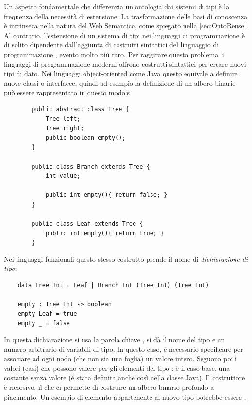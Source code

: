 Un aspetto fondamentale che differenzia un'ontologia dai sistemi di tipi è la frequenza della necessità di estensione. La trasformazione delle basi di conoscenza è intrinseca nella natura del Web Semantico, come spiegato nella \autoref{sec:OntoReuse}. Al contrario, l'estensione di un sistema di tipi nei linguaggi di programmazione è di solito dipendente dall'aggiunta di costrutti sintattici del linguaggio di programmazione \cite{pierceTypesBook}, evento molto più raro. Per raggirare questo problema, i linguaggi di programmazione moderni offrono costrutti sintattici per creare nuovi tipi di dato. Nei linguaggi object-oriented come Java questo equivale a definire nuove classi o interfacce, quindi ad esempio la definizione di un albero binario può essere rappresentato in questo modo:s
\begin{verbatim}
		public abstract class Tree {
			Tree left;
			Tree right;
			public boolean empty();
		}
		
		public class Branch extends Tree {
			int value;
		
			public int empty(){ return false; }
		}
		
		public class Leaf extends Tree {	
			public int empty(){ return true; }
		}
\end{verbatim}
\newpage\noindent
Nei linguaggi funzionali questo stesso costrutto prende il nome di \textit{dichiarazione di tipo}:
\begin{verbatim}
	data Tree Int = Leaf | Branch Int (Tree Int) (Tree Int)
	
	empty : Tree Int -> boolean
	empty Leaf = true
	empty _ = false
\end{verbatim}
In questa dichiarazione si usa la parola chiave , si dà il nome del tipo e un numero arbitrario di variabili di tipo. In questo caso, è necessario specificare  per associare ad ogni nodo (che non sia una foglia) un valore intero. Seguono poi i valori (casi) che possono valere per gli elementi del tipo :  è il caso base, una costante senza valore (è stata definita anche così nella classe Java). Il costruttore  è ricorsivo, il che ci permette di costruire un albero binario profondo a piacimento. Un esempio di elemento appartenente al nuovo tipo  potrebbe essere .

